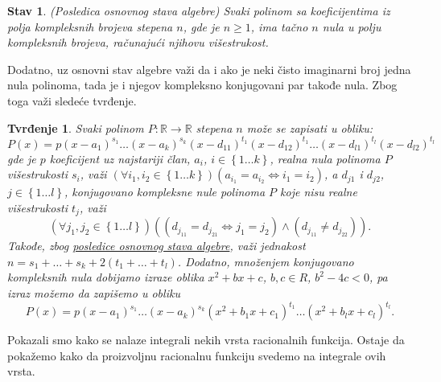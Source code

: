 \documentclass{article}
\newtheorem{stav}{Stav}[section]
\newtheorem{tvr}{Tvrđenje}[section]
\begin{document}
\begin{stavbox}
    \label{podsetnik_stava_1}
    \begin{stav}
        (Posledica osnovnog stava algebre) Svaki polinom sa koeficijentima iz polja kompleksnih brojeva
        stepena $n$, gde je $n\geq1$, ima tačno
        $n$ nula u polju kompleksnih brojeva, računajući njihovu višestrukost.
    \end{stav}
\end{stavbox}

Dodatno, uz osnovni stav algebre važi da i ako je neki čisto imaginarni
broj jedna nula polinoma, tada je i njegov kompleksno konjugovani
par takođe nula. Zbog toga važi sledeće tvrđenje.

\begin{tvrbox}
    \label{tvrđenje_1.1}
    \begin{tvr}
        Svaki polinom $P:\mathbb{R}\longrightarrow\mathbb{R}$ stepena $n$
        može se zapisati u obliku:
        $$P\left(x\right)=p\left(x-a_1\right)^{s_1}\dotsc\left(x-a_k\right)^{s_k}\left(x-d_{11}\right)^{t_1}\left(x-d_{12}\right)^{t_1}\dotsc\left(x-d_{l1}\right)^{t_l}\left(x-d_{l2}\right)^{t_l}$$
        gde je $p$ koeficijent uz najstariji član,
        $a_i$, $i\in\left\{1\dotsc k\right\}$, realna nula polinoma $P$ višestrukosti $s_i$, važi $\left(\forall i_1,i_2\in\left\{1\dotsc k\right\}\right)\left(a_{i_1}=a_{i_2}\iff i_1=i_2\right)$,
        a $d_{j1}$ i $d_{j2}$,
        $j\in\left\{1\dotsc l\right\}$, konjugovano kompleksne nule polinoma $P$ koje nisu realne
        višestrukosti $t_j$, važi
        $$\left(\forall j_1,j_2\in\left\{1\dotsc l\right\}\right)\left(\left(d_{j_11}=d_{j_21}\iff j_1=j_2\right)\land\left(d_{j_11}\neq d_{j_22}\right)\right).$$
        Takođe, zbog \hyperref[podsetnik_stava_1]{posledice osnovnog stava algebre}, važi jednakost $n=s_1+\dotsc+s_k+2\left(t_1+\dotsc+t_l\right)$. Dodatno,
        množenjem konjugovano kompleksnih nula dobijamo izraze oblika $x^2+bx+c$, $b,c\in{R}$, $b^2-4c<0$,
        pa izraz možemo da zapišemo u obliku
        $$P\left(x\right)=p\left(x-a_1\right)^{s_1}\dotsc\left(x-a_k\right)^{s_k}\left(x^2+b_1x+c_1\right)^{t_1}\dotsc\left(x^2+b_lx+c_l\right)^{t_l}.$$
    \end{tvr}
\end{tvrbox}

Pokazali smo kako se nalaze integrali nekih vrsta
racionalnih funkcija. Ostaje da pokažemo kako da
proizvoljnu racionalnu funkciju svedemo na
integrale ovih vrsta.
\end{document}
